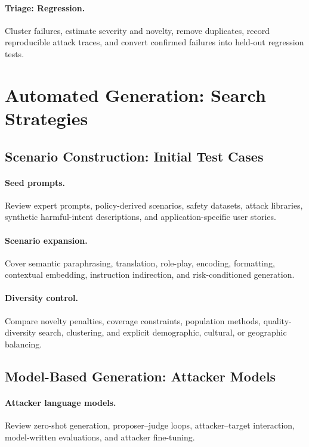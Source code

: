 \documentclass[review]{fcs}
\begin{document}
\paragraph{Triage: Regression.}
Cluster failures, estimate severity and novelty, remove duplicates, record reproducible attack traces, and convert confirmed failures into held-out regression tests.

\section{Automated Generation: Search Strategies}
\label{sec:generation}

\subsection{Scenario Construction: Initial Test Cases}

\paragraph{Seed prompts.}
Review expert prompts, policy-derived scenarios, safety datasets, attack libraries, synthetic harmful-intent descriptions, and application-specific user stories.

\paragraph{Scenario expansion.}
Cover semantic paraphrasing, translation, role-play, encoding, formatting, contextual embedding, instruction indirection, and risk-conditioned generation.

\paragraph{Diversity control.}
Compare novelty penalties, coverage constraints, population methods, quality-diversity search, clustering, and explicit demographic, cultural, or geographic balancing.

\subsection{Model-Based Generation: Attacker Models}

\paragraph{Attacker language models.}
Review zero-shot generation, proposer--judge loops, attacker--target interaction, model-written evaluations, and attacker fine-tuning.
\end{document}

